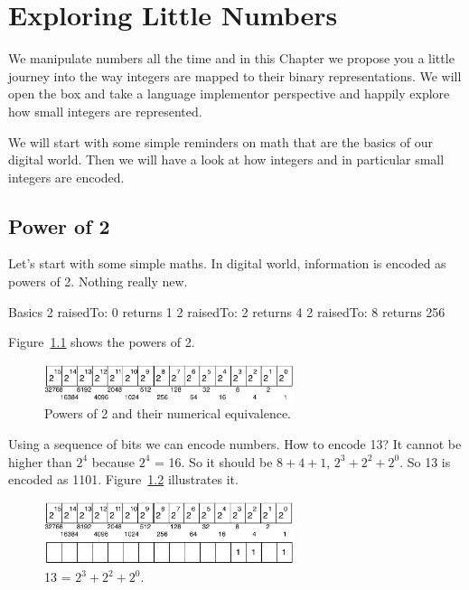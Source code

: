 \documentclass[a4paper,10pt,twoside]{book}
\begin{document}
\fi
\sloppy

\chapter{Exploring Little Numbers}

We manipulate numbers all the time and in this Chapter we propose you a little journey into the way 
integers are mapped to their binary representations. We will open the box and take a language implementor perspective and happily explore how small integers are represented. 

We will start with some simple reminders on math that are the basics of our digital world. Then we will have a look at how integers and in particular small integers are encoded.

\section{Power of 2}

Let's start with some simple maths. In digital world, information is encoded as powers of 2. Nothing really new. 

\begin{code}{Basics}
2 raisedTo: 0
	returns 1
2 raisedTo: 2
	returns 4
2 raisedTo: 8
	returns 256
\end{code}

Figure~\ref{power} shows the powers of 2. 
\begin{figure}[h]
\begin{center}
\includegraphics[width=0.65\textwidth]{16bits-number}
\caption{Powers of 2 and their numerical equivalence.\label{power}}
\end{center}
\end{figure}

Using a sequence of bits we can encode numbers. How to encode 13? It cannot be higher than $2^{4}$ because $2^{4}$ = 16. So it should be $8 + 4 + 1$, $2^{3} + 2^{2} + 2^{0}$. So 13 is encoded as 1101.  Figure~\ref{16bits-number13} illustrates it.

\begin{figure}[h]
\begin{center}
\includegraphics[width=0.65\textwidth]{16bits-number13}
\caption{13 = $2^{3} + 2^{2} + 2^{0}$.\label{16bits-number13}}
\end{center}
\end{figure}
\end{document}
